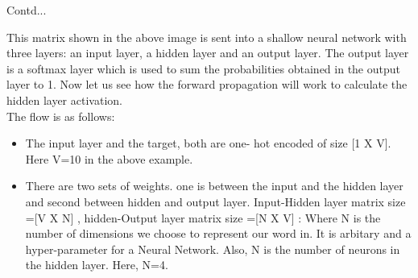 \documentclass{beamer}
\begin{document}
\begin{frame}{Contd...}
\begin{flushleft}
This matrix shown in the above image is sent into a shallow neural network with three layers: an input layer, a hidden layer and an output layer. The output layer is a softmax layer which is used to sum the probabilities obtained in the output layer to 1. Now let us see how the forward propagation will work to calculate the hidden layer activation.\\
\vspace{10pt}
The flow is as follows:
\begin{itemize}
	\item The input layer and the target, both are one- hot encoded of size [1 X V]. Here V=10 in the above example.
	\item There are two sets of weights. one is between the input and the hidden layer and second between hidden and output layer.
Input-Hidden layer matrix size =[V X N] , hidden-Output layer matrix  size =[N X V] : Where N is the number of dimensions we choose to represent our word in. It is arbitary and a hyper-parameter for a Neural Network. Also, N is the number of neurons in the hidden layer. Here, N=4.
\end{itemize}
	\end{flushleft}
\end{frame}
\end{document}
